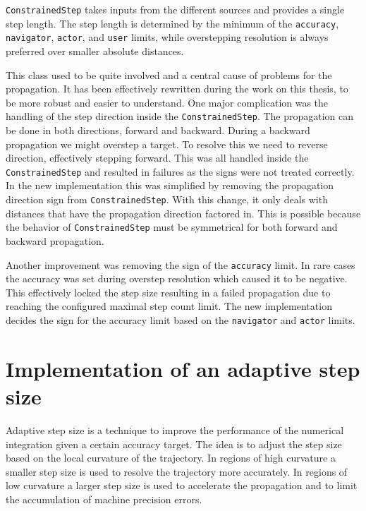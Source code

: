 \texttt{ConstrainedStep} takes inputs from the different sources and provides a single step length. The step length is determined by the minimum of the \texttt{accuracy}, \texttt{navigator}, \texttt{actor}, and \texttt{user} limits, while overstepping resolution is always preferred over smaller absolute distances.

This class used to be quite involved and a central cause of problems for the propagation. It has been effectively rewritten during the work on this thesis, to be more robust and easier to understand. One major complication was the handling of the step direction inside the \texttt{ConstrainedStep}. The propagation can be done in both directions, forward and backward. During a backward propagation we might overstep a target. To resolve this we need to reverse direction, effectively stepping forward. This was all handled inside the \texttt{ConstrainedStep} and resulted in failures as the signs were not treated correctly. In the new implementation this was simplified by removing the propagation direction sign from \texttt{ConstrainedStep}. With this change, it only deals with distances that have the propagation direction factored in. This is possible because the behavior of \texttt{ConstrainedStep} must be symmetrical for both forward and backward propagation.

Another improvement was removing the sign of the \texttt{accuracy} limit. In rare cases the accuracy was set during overstep resolution which caused it to be negative. This effectively locked the step size resulting in a failed propagation due to reaching the configured maximal step count limit. The new implementation decides the sign for the accuracy limit based on the \texttt{navigator} and \texttt{actor} limits.

\section{Implementation of an adaptive step size}
\label{sec:dev/stepper/adaptive-step-size}

Adaptive step size is a technique to improve the performance of the numerical integration given a certain accuracy target. The idea is to adjust the step size based on the local curvature of the trajectory. In regions of high curvature a smaller step size is used to resolve the trajectory more accurately. In regions of low curvature a larger step size is used to accelerate the propagation and to limit the accumulation of machine precision errors.

